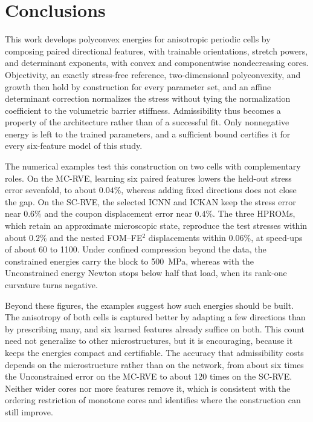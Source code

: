 \section{Conclusions}
\label{sec:conclusions}
This work develops polyconvex energies for anisotropic periodic cells by composing paired directional features, with trainable orientations, stretch powers, and determinant exponents, with convex and componentwise nondecreasing cores.  Objectivity, an exactly stress-free reference, two-dimensional polyconvexity, and growth then hold by construction for every parameter set, and an affine determinant correction normalizes the stress without tying the normalization coefficient to the volumetric barrier stiffness.  Admissibility thus becomes a property of the architecture rather than of a successful fit.  Only nonnegative energy is left to the trained parameters, and a sufficient bound certifies it for every six-feature model of this study.

The numerical examples test this construction on two cells with complementary roles.  On the MC-RVE, learning six paired features lowers the held-out stress error sevenfold, to about $0.04\%$, whereas adding fixed directions does not close the gap.  On the SC-RVE, the selected ICNN and ICKAN keep the stress error near $0.6\%$ and the coupon displacement error near $0.4\%$.  The three HPROMs, which retain an approximate microscopic state, reproduce the test stresses within about $0.2\%$ and the nested FOM--FE$^2$ displacements within $0.06\%$, at speed-ups of about 60 to 1100.  Under confined compression beyond the data, the constrained energies carry the block to 500~MPa, whereas with the Unconstrained energy Newton stops below half that load, when its rank-one curvature turns negative.

Beyond these figures, the examples suggest how such energies should be built.  The anisotropy of both cells is captured better by adapting a few directions than by prescribing many, and six learned features already suffice on both.  This count need not generalize to other microstructures, but it is encouraging, because it keeps the energies compact and certifiable.  The accuracy that admissibility costs depends on the microstructure rather than on the network, from about six times the Unconstrained error on the MC-RVE to about 120 times on the SC-RVE.  Neither wider cores nor more features remove it, which is consistent with the ordering restriction of monotone cores and identifies where the construction can still improve.

